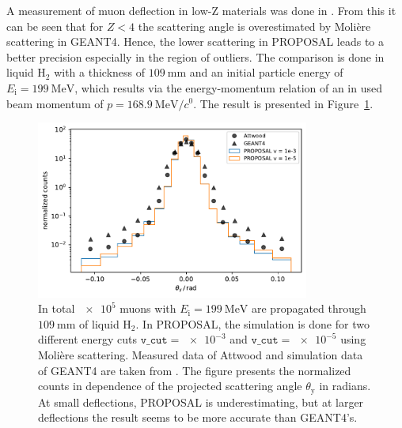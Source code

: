 \documentclass[pdflatex, sn-mathphys]{sn-jnl}%
\theoremstyle{thmstyleone}%
\theoremstyle{thmstyletwo}%
\theoremstyle{thmstylethree}%
\begin{document}
A measurement of muon deflection in low-Z materials was done in \cite{attwood_2006}. 
From this it can be seen that for $Z < 4$ the scattering angle is overestimated 
by Molière scattering in GEANT4. Hence, the lower scattering in PROPOSAL leads 
to a better precision especially in the region of outliers. The comparison is 
done in liquid $\text{H}_2$ with a thickness of $\SI{109}{\milli\meter}$ and an 
initial particle energy of $E_{\mathrm{i}} = \SI{199}{\mega\electronvolt}$, which 
results via the energy-momentum relation of an in \cite{attwood_2006} used beam momentum 
of $p = \SI[per-mode=symbol]{168.9}{\mega\electronvolt\per\clight}$. 
The result is presented in Figure~\ref{fig:attwood_comparison}.
\begin{figure}
    \centering 
    \includegraphics[width=0.8\textwidth]{../../deflection/plots/FINAL/attwood_comparison_moliere_E199MeV_final.pdf}
    \caption{In total $\num{e5}$ muons with $E_{\mathrm{i}} = \SI{199}{\mega\electronvolt}$ are propagated through 
    $\SI{109}{\milli\meter}$ of liquid $\text{H}_2$. In PROPOSAL, the simulation is done 
    for two different energy cuts $\texttt{v\_cut} = \num{e-3}$ and $\texttt{v\_cut} = \num{e-5}$ using Molière scattering.
    Measured data of Attwood and simulation data of GEANT4 are taken from \cite{attwood_2006}. The figure presents 
    the normalized counts in dependence of the projected scattering angle $\theta_{\mathrm{y}}$ in radians. At small deflections, PROPOSAL 
    is underestimating, but at larger deflections the result seems to be more accurate than GEANT4's.}
    \label{fig:attwood_comparison}
\end{figure}
\end{document}
